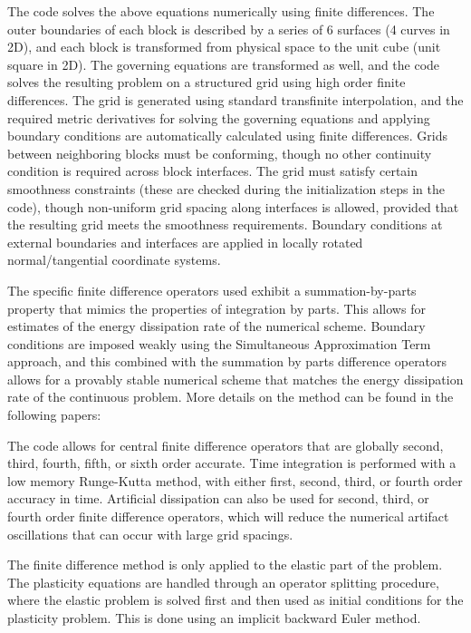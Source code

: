 \documentclass[12pt]{article}   	%
\begin{document}
The code solves the above equations numerically using finite differences. The outer boundaries of each block is described by a series of 6 surfaces (4 curves in 2D), and each block is transformed from physical space to the unit cube (unit square in 2D). The governing equations are transformed as well, and the code solves the resulting problem on a structured grid using high order finite differences. The grid is generated using standard transfinite interpolation, and the required metric derivatives for solving the governing equations and applying boundary conditions are automatically calculated using finite differences. Grids between neighboring blocks must be conforming, though no other continuity condition is required across block interfaces. The grid must satisfy certain smoothness constraints (these are checked during the initialization steps in the code), though non-uniform grid spacing along interfaces is allowed, provided that the resulting grid meets the smoothness requirements. Boundary conditions at external boundaries and interfaces are applied in locally rotated normal/tangential coordinate systems.

The specific finite difference operators used exhibit a summation-by-parts property that mimics the properties of integration by parts. This allows for estimates of the energy dissipation rate of the numerical scheme. Boundary conditions are imposed weakly using the Simultaneous Approximation Term approach, and this combined with the summation by parts difference operators allows for a provably stable numerical scheme that matches the energy dissipation rate of the continuous problem. More details on the method can be found in the following papers:

The code allows for central finite difference operators that are globally second, third, fourth, fifth, or sixth order accurate. Time integration is performed with a low memory Runge-Kutta method, with either first, second, third, or fourth order accuracy in time. Artificial dissipation can also be used for second, third, or fourth order finite difference operators, which will reduce the numerical artifact oscillations that can occur with large grid spacings.

The finite difference method is only applied to the elastic part of the problem. The plasticity equations are handled through an operator splitting procedure, where the elastic problem is solved first and then used as initial conditions for the plasticity problem. This is done using an implicit backward Euler method.
\end{document}
